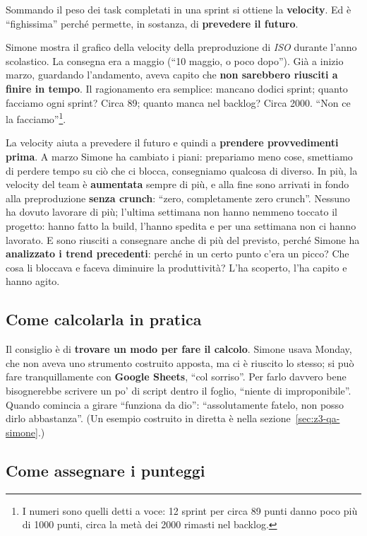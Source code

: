 Sommando il peso dei task completati in una sprint si ottiene la
\textbf{velocity}. Ed è ``fighissima'' perché permette, in sostanza, di
\textbf{prevedere il futuro}.

Simone mostra il grafico della velocity della preproduzione di \emph{ISO}
durante l'anno scolastico. La consegna era a maggio (``10 maggio, o poco
dopo''). Già a inizio marzo, guardando l'andamento, aveva capito che \textbf{non
sarebbero riusciti a finire in tempo}. Il ragionamento era semplice: mancano
dodici sprint; quanto facciamo ogni sprint? Circa 89; quanto manca nel
backlog? Circa 2000. ``Non ce la facciamo''\footnote{I numeri sono quelli
detti a voce: 12 sprint per circa 89 punti danno poco più di 1000 punti,
circa la metà dei 2000 rimasti nel backlog.}.

La velocity aiuta a prevedere il futuro e quindi a \textbf{prendere
provvedimenti prima}. A marzo Simone ha cambiato i piani: prepariamo meno
cose, smettiamo di perdere tempo su ciò che ci blocca, consegniamo qualcosa di
diverso. In più, la velocity del team è \textbf{aumentata} sempre di più, e
alla fine sono arrivati in fondo alla preproduzione \textbf{senza crunch}:
``zero, completamente zero crunch''. Nessuno ha dovuto lavorare di più;
l'ultima settimana non hanno nemmeno toccato il progetto: hanno fatto la
build, l'hanno spedita e per una settimana non ci hanno lavorato. E sono
riusciti a consegnare anche di più del previsto, perché Simone ha
\textbf{analizzato i trend precedenti}: perché in un certo punto c'era un
picco? Che cosa li bloccava e faceva diminuire la produttività? L'ha
scoperto, l'ha capito e hanno agito.

\subsection{Come calcolarla in pratica}

Il consiglio è di \textbf{trovare un modo per fare il calcolo}. Simone usava
Monday, che non aveva uno strumento costruito apposta, ma ci è riuscito lo
stesso; si può fare tranquillamente con \textbf{Google Sheets}, ``col
sorriso''. Per farlo davvero bene bisognerebbe scrivere un po' di script
dentro il foglio, ``niente di improponibile''. Quando comincia a girare
``funziona da dio'': ``assolutamente fatelo, non posso dirlo abbastanza''. (Un
esempio costruito in diretta è nella sezione~\ref{sec:z3-qa-simone}.)

\subsection{Come assegnare i punteggi}

